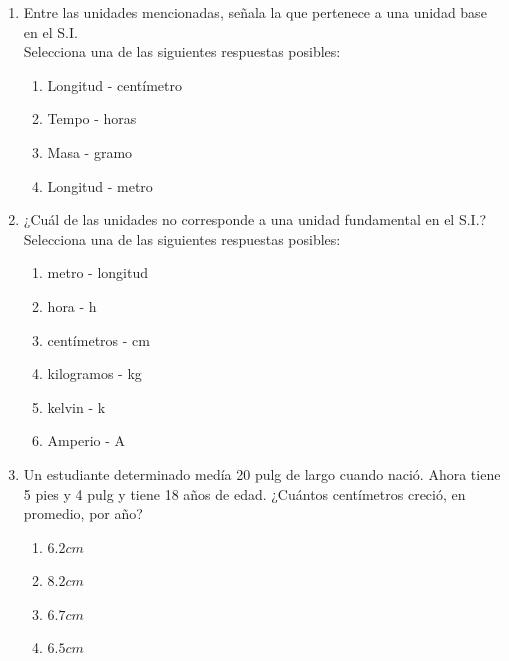 \documentclass[12pt]{article}
\begin{document}
\begin{enumerate}
      \item Entre las unidades mencionadas, señala la que pertenece a una unidad base en el S.I.\\
      Selecciona una de las siguientes respuestas posibles:
       \begin{multicols}{2}
     \begin{enumerate}
         \item Longitud - centímetro
         \item Tempo - horas
         \item Masa - gramo
         \item Longitud - metro
              \end{enumerate}
     \end{multicols}
      
     \item ¿Cuál de las unidades no corresponde a una unidad fundamental en el S.I.?\\
     Selecciona una de las siguientes respuestas posibles:
        \begin{multicols}{2}
     \begin{enumerate}
         \item metro - longitud
         \item hora - h
         \item centímetros - cm
         \item kilogramos - kg
         \item kelvin - k
         \item Amperio - A
         
              \end{enumerate}
     \end{multicols}
      
     \item  Un estudiante determinado medía 20 pulg de largo cuando nació. Ahora tiene 5 pies y 4 pulg y tiene 18 años de edad. ¿Cuántos centímetros creció, en promedio, por año?
     \begin{multicols}{2}
     \begin{enumerate}
     \item $6.2 cm$  
      \item $8.2 cm$
      \item $6.7 cm$
      \item $6.5 cm$
        \end{enumerate}
     \end{multicols}
     
     
       \end{enumerate}
      
\end{document}
